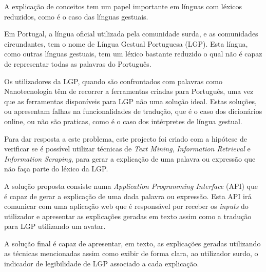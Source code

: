 \begin{abstractotherlanguage}
   A explicação de conceitos tem um papel importante em línguas com léxicos reduzidos, como é o caso das línguas gestuais.

    Em Portugal, a língua oficial utilizada pela comunidade surda, e as comunidades circundantes, tem o nome de Língua Gestual Portuguesa (LGP).
    Esta língua, como outras línguas gestuais, tem um léxico bastante reduzido o qual não é capaz de representar todas as palavras do Português.

    Os utilizadores da LGP, quando são confrontados com palavras como Nanotecnologia têm de recorrer a ferramentas criadas para Português, uma vez que as ferramentas disponíveis para LGP não uma solução ideal.
    Estas soluções, ou apresentam falhas na funcionalidades de tradução, que é o caso dos dicionários online, ou não são praticas, como é o caso dos intérpretes de língua gestual.

    Para dar resposta a este problema, este projecto foi criado com a hipótese de verificar se é possível utilizar técnicas de \textit{Text Mining}, \textit{Information Retrieval} e \textit{Information Scraping}, para gerar a explicação de uma palavra ou expressão que não faça parte do léxico da LGP.

    A solução proposta consiste numa \textit{Application Programming Interface} (API) que é capaz de gerar a explicação de uma dada palavra ou expressão.
    Esta API irá comunicar com uma aplicação web que é responsável por receber os \textit{inputs} do utilizador e apresentar as explicações geradas em texto assim como a tradução para LGP utilizando um avatar.

    A solução final é capaz de apresentar, em texto, as explicações geradas utilizando as técnicas mencionadas assim como exibir de forma clara, ao utilizador surdo, o indicador de legibilidade de LGP associado a cada explicação.

\end{abstractotherlanguage}


